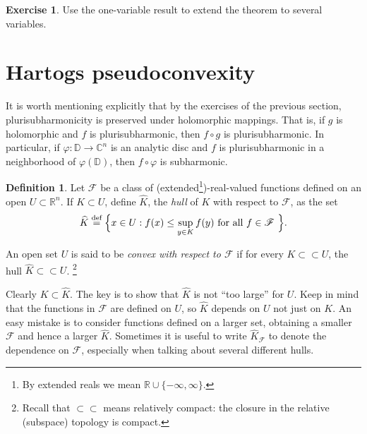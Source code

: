\documentclass[12pt,openany]{book}
\newcommand{\C}{{\mathbb{C}}}
\newcommand{\R}{{\mathbb{R}}}
\newcommand{\D}{{\mathbb{D}}}
\newcommand{\sF}{{\mathscr{F}}}
\newcommand{\myindex}[1]{#1\index{#1}}
\theoremstyle{plain}
\theoremstyle{remark}
\theoremstyle{definition}
\newtheorem{defn}[thm]{Definition}
\newenvironment{exbox}{%
    \def\FrameCommand{\vrule width 1pt \relax\hspace{10pt}}%
    \MakeFramed{\advance\hsize-\width\FrameRestore}%
}{%
    \endMakeFramed
}
\theoremstyle{exercise}
\newtheorem{exercise}{Exercise}[section]
\theoremstyle{example}
\begin{document}
\begin{exbox}
\begin{exercise}
Use the one-variable result to extend the theorem to several variables.
\end{exercise}
\end{exbox}


\section{Hartogs pseudoconvexity}

It is worth mentioning explicitly that by the
exercises of the previous section,
plurisubharmonicity is preserved under holomorphic mappings.
That is, if $g$ is holomorphic and $f$ is plurisubharmonic, then
$f \circ g$ is plurisubharmonic.  In particular, if $\varphi \colon \D \to
\C^n$ is an analytic disc and $f$ is plurisubharmonic in a neighborhood of
$\varphi(\D)$,
then $f \circ \varphi$ is subharmonic.

\begin{defn}
Let $\sF$ be a class of (extended\footnote{%
By extended reals we mean $\R \cup \{ -\infty,\infty\}$.})-real-valued
functions defined on an open $U \subset \R^n$.  If $K
\subset U$, define $\widehat{K}$, the \emph{\myindex{hull}} of $K$ with
respect to $\sF$, as the set
%
\begin{equation*}
\widehat{K} \overset{\text{def}}{=} \Bigl\{ x \in U : f(x) \leq \sup_{y\in K} f(y)
\text{ for all $f \in \sF$ } \Bigr\} .
\end{equation*}

An open set $U$ is said to be \emph{convex with respect to $\sF$}\index{convex!with respect to $\sF$}
if for every $K \subset \subset U$, the hull $\widehat{K} \subset \subset U$.%
\footnote{Recall that $\subset \subset$ means relatively compact:
the closure in the relative (subspace) topology is compact.}
\end{defn}

Clearly $K \subset \widehat{K}$.  The key is to show that $\widehat{K}$
is not ``too large'' for $U$.
Keep in mind that the functions in $\sF$ are defined on $U$, so $\widehat{K}$
depends on $U$ not just on $K$.  An easy mistake is to consider functions defined
on a larger set, obtaining a smaller $\sF$ and hence a larger
$\widehat{K}$.  Sometimes it is useful to write $\widehat{K}_{\sF}$ to
denote the dependence on $\sF$, especially when talking about several different
hulls.
\end{document}
